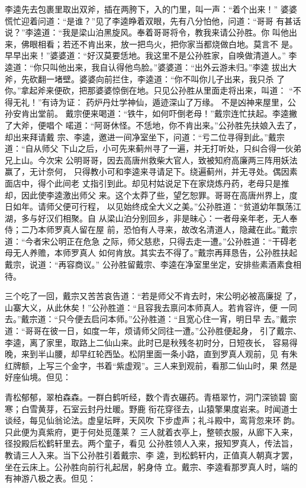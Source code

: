 李逵先去包裹里取出双斧，插在两胯下，入的门里，叫一声：“着个出来！”
婆婆慌忙迎着问道：“是谁？”见了李逵睁着双眼，先有八分怕他，问道：“哥哥
有甚话说？”李逵道：“我是梁山泊黑旋风。奉着哥哥将令，教我来请公孙胜。你
叫他出来，佛眼相看；若还不肯出来，放一把鸟火，把你家当都烧做白地。莫言不
是。早早出来！”婆婆道：“好汉莫要恁地。我这里不是公孙胜家，自唤做清道人。”
李逵道：“你只叫他出来，我自认得他鸟脸。”婆婆道：“出外云游未归。”李逵
拔出大斧，先砍翻一堵壁。婆婆向前拦住，李逵道：“你不叫你儿子出来，我只杀
了你。”拿起斧来便砍，把那婆婆惊倒在地。只见公孙胜从里面走将出来，叫道：
“不得无礼！”有诗为证：
药炉丹灶学神仙，遁迹深山了万缘。
不是凶神来屋里，公孙安肯出堂前。
戴宗便来喝道：“铁牛，如何吓倒老母！”戴宗连忙扶起。李逵撇了大斧，便唱个
喏道：“阿哥休怪。不恁地，你不肯出来。”公孙胜先扶娘入去了，却出来拜请戴
宗、李逵，邀进一间净室坐下，问道：“亏二位寻得到此。”戴宗道：“自从师父
下山之后，小可先来蓟州寻了一遍，并无打听处，只纠合得一伙弟兄上山。今次宋
公明哥哥，因去高唐州救柴大官人，致被知府高廉两三阵用妖法赢了，无计奈何，
只得教小可和李逵来寻请足下。绕遍蓟州，并无寻处。偶因素面店中，得个此间老
丈指引到此。却见村姑说足下在家烧炼丹药，老母只是推却，因此使李逵激出师父
来。这个太莽了些，望乞恕罪。哥哥在高唐州界上，度日如年。请师父便可行程，
以见始终成全大义之美。”公孙胜道：“贫道幼年飘荡江湖，多与好汉们相聚。自
从梁山泊分别回乡，非是昧心：一者母亲年老，无人奉侍；二乃本师罗真人留在屋
前，恐怕有人寻来，故改名清道人，隐藏在此。”戴宗道：“今者宋公明正在危急
之际，师父慈悲，只得去走一遭。”公孙胜道：“干碍老母无人养赡，本师罗真人
如何肯放。其实去不得了。”戴宗再拜恳告，公孙胜扶起戴宗，说道：“再容商议。”
公孙胜留戴宗、李逵在净室里坐定，安排些素酒素食相待。

三个吃了一回，戴宗又苦苦哀告道：“若是师父不肯去时，宋公明必被高廉捉
了，山寨大义，从此休矣！”公孙胜道：“且容我去禀问本师真人。若肯容许，便
一同去。”戴宗道：“只今便去启问本师。”公孙胜道：“且宽心住一宵，明日早
去。”戴宗道：“哥哥在彼一日，如度一年，烦请师父同往一遭。”公孙胜便起身，
引了戴宗、李逵，离了家里，取路上二仙山来。此时已是秋残冬初时分，日短夜长，
容易得晚，来到半山腰，却早红轮西坠。松阴里面一条小路，直到罗真人观前，见
有朱红牌额，上写三个金字，书着“紫虚观”。三人来到观前，看那二仙山时，果
然是好座仙境。但见：

青松郁郁，翠柏森森。一群白鹤听经，数个青衣碾药。青梧翠竹，洞门深锁碧
窗寒；白雪黄芽，石室云封丹灶暖。野鹿
衔花穿径去，山猿擎果度岩来。时闻道士谈经，每见仙翁论法。虚皇坛畔，天风吹
下步虚声；礼斗殿中，鸾背忽来环韵。只此便为真紫府，更于何处觅蓬莱？
三人就着衣亭上，整顿衣服，从廊下入来，径投殿后松鹤轩里去。两个童子，看见
公孙胜领人入来，报知罗真人，传法旨，教请三人入来。当下公孙胜引着戴宗、李
逵，到松鹤轩内，正值真人朝真才罢，坐在云床上。公孙胜向前行礼起居，躬身侍
立。戴宗、李逵看那罗真人时，端的有神游八极之表。但见：

